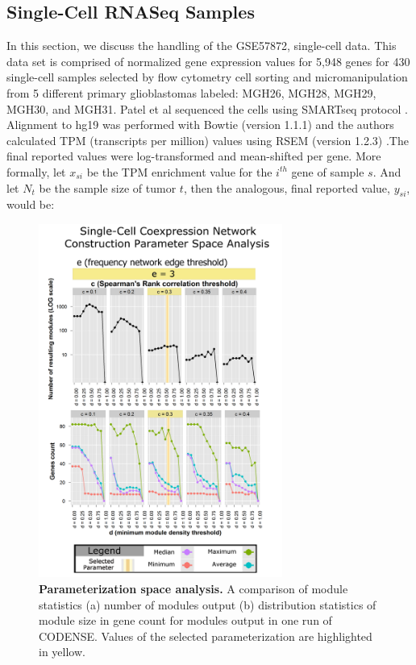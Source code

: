 \documentclass[10pt,letterpaper]{article}
\begin{document}
\subsection*{Single-Cell RNASeq Samples }
In this section, we discuss the handling of the GSE57872, single-cell data. This data set is comprised of normalized gene expression values for 5,948 genes for 430 single-cell samples selected by flow cytometry cell sorting and micromanipulation from 5 different primary glioblastomas labeled: MGH26, MGH28, MGH29, MGH30, and MGH31. Patel et al sequenced the cells using SMARTseq protocol \cite{Ramskold2012}. Alignment to hg19 was performed with Bowtie (version 1.1.1) \cite{Langmead2009} and the authors calculated TPM (transcripts per million) values using RSEM (version 1.2.3) \cite{Li2011}.The final reported values were log-transformed and mean-shifted per gene. More formally, let $x_{si}$ be the TPM enrichment value for the $i^{th}$ gene of sample $s$. And let $N_{t}$ be the sample size of tumor $t$, then the analogous, final reported value, $y_{si}$, would be: %

\begin{figure}[h]
\centering
\includegraphics[width=80mm]{Figures/ParameterSpaceE=3}
\caption{\textbf{Parameterization space analysis.} A comparison of module statistics (a) number of modules output (b) distribution statistics of module size in gene count for modules output in one run of CODENSE. Values of the selected parameterization are highlighted in yellow.}
\label{Parameter Space Figure}
\end{figure}
\end{document}
